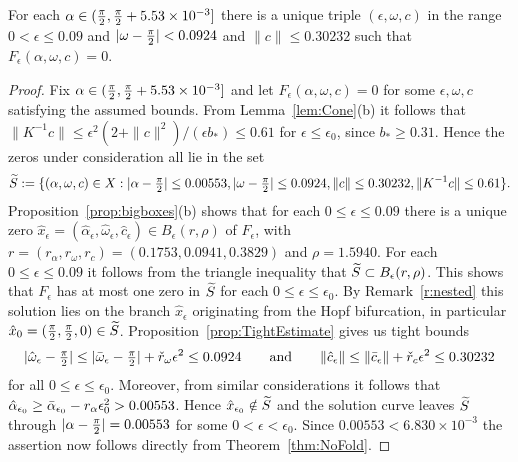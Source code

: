 
\begin{theorem}
	\label{thm:UniqunessNbd}
	For each $\alpha  \in  (\tfrac{\pi}{2} , \tfrac{\pi}{2} + 5.53 \times 10^{-3} ] $ there is a unique triple $ ( \epsilon, \omega, c)$ in the range 
$ 0 < \epsilon \leq 0.09$
	and 
$ | \omega - \tfrac{\pi}{2}| < 0.0924 $
	and  
$ \| c \| \leq 0.30232 $ 
such that $ F_\epsilon(\alpha, \omega, c)=0$. 	
\end{theorem}
 
\begin{proof}
Fix $ \alpha \in ( \tfrac{\pi}{2} , \tfrac{\pi}{2} + 5.53 \times 10^{-3}]$ and let $F_\epsilon(\alpha, \omega, c)=0$ for some $\epsilon, \omega, c$ satisfying the assumed bounds. 
From Lemma~\ref{lem:Cone}(b) it follows that 
$\|K^{-1}c\| \leq \epsilon^2 (2+ \|c\|^2) /(\epsilon b_*) \leq 0.61$
for $\epsilon \leq \epsilon_0$, 
since $b_* \geq 0.31$. 
Hence the zeros under consideration all lie in the set 
\[
\widetilde{S} :=  \{ (\alpha,\omega,c) \in X : | \alpha - \tfrac{\pi}{2} | \leq 0.00553 , |\omega - \tfrac{\pi}{2}| \leq 0.0924, \| c \| \leq 0.30232, \|K^{-1} c \| \leq 0.61  \}.
\]
Proposition~\ref{prop:bigboxes}(b) shows that for each $0\leq\epsilon\leq 0.09$
there is a unique zero $\hat{x}_\epsilon=
(\hat{\alpha}_\epsilon,\hat{\omega}_\epsilon,\hat{c}_\epsilon) \in B_\epsilon(r,\rho)$ of $F_\epsilon$,
with $r=(r_\alpha,r_\omega,r_c) = (0.1753,0.0941,0.3829)$ and $\rho= 1.5940$.
For each $0 \leq \epsilon \leq 0.09$ it follows from the triangle inequality  that $\widetilde{S} \subset B_\epsilon(r,\rho)$.  
This shows that $F_\epsilon$ has at most one zero in $\widetilde{S}$ for each $ 0 \leq \epsilon \leq \epsilon_0$. 
By Remark~\ref{r:nested} this solution lies on the branch $\hat{x}_\epsilon$ originating from the Hopf bifurcation, in particular $\hat{x}_0=(\tfrac{\pi}{2},\tfrac{\pi}{2},0) \in \widetilde{S}$.
Proposition~\ref{prop:TightEstimate} gives us tight bounds 
\[
|\hat{\omega}_\epsilon - \tfrac{\pi}{2}| \leq |\bar{\omega}_\epsilon - \tfrac{\pi}{2}|  + \check{r}_\omega \epsilon^2 \leq 0.0924
\qquad\text{and}\qquad \| \hat{c}_\epsilon \| \leq \| \bar{c}_\epsilon\|  + \check{r}_c \epsilon^2 \leq 0.30232
\]
for all $0 \leq \epsilon \leq \epsilon_0$.  
Moreover, from similar considerations it follows that $\hat{\alpha}_{\epsilon_0} \geq  \bar{\alpha}_{\epsilon_0} - r_\alpha \epsilon_0^2 > 0.00553$. Hence $\hat{x}_{\epsilon_0} \notin \widetilde{S}$ and the solution curve leaves $\widetilde{S}$ through $|\alpha- \tfrac{\pi}{2}| = 0.00553$ for some $0<\epsilon <\epsilon_0$.
Since $0.00553  < 6.830 \times 10^{-3}$ the assertion now follows directly from Theorem~\ref{thm:NoFold}.
\end{proof}
%

